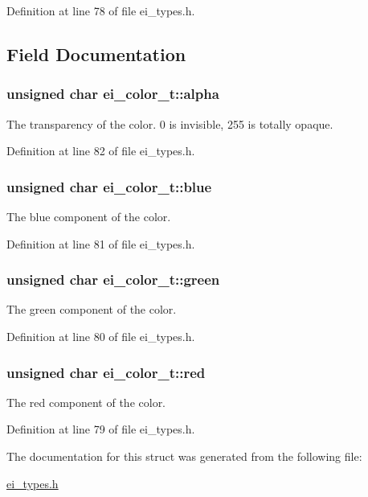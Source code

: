 Definition at line 78 of file ei\_\-types.h.

\subsection{Field Documentation}
\hypertarget{structei__color__t_af213a14356db920b1a04f5270263ae61}{
\subsubsection[{alpha}]{\setlength{\rightskip}{0pt plus 5cm}unsigned char {\bf ei\_\-color\_\-t::alpha}}}
\label{structei__color__t_af213a14356db920b1a04f5270263ae61}


The transparency of the color. 0 is invisible, 255 is totally opaque. 

Definition at line 82 of file ei\_\-types.h.\hypertarget{structei__color__t_af8d67b7a72cbb586519b55033350fb8c}{
\subsubsection[{blue}]{\setlength{\rightskip}{0pt plus 5cm}unsigned char {\bf ei\_\-color\_\-t::blue}}}
\label{structei__color__t_af8d67b7a72cbb586519b55033350fb8c}


The blue component of the color. 

Definition at line 81 of file ei\_\-types.h.\hypertarget{structei__color__t_ad85ce262fb9c76fe3c52b4eed19505d1}{
\subsubsection[{green}]{\setlength{\rightskip}{0pt plus 5cm}unsigned char {\bf ei\_\-color\_\-t::green}}}
\label{structei__color__t_ad85ce262fb9c76fe3c52b4eed19505d1}


The green component of the color. 

Definition at line 80 of file ei\_\-types.h.\hypertarget{structei__color__t_a9adf283c79176b3426ac63784f0bc17b}{
\subsubsection[{red}]{\setlength{\rightskip}{0pt plus 5cm}unsigned char {\bf ei\_\-color\_\-t::red}}}
\label{structei__color__t_a9adf283c79176b3426ac63784f0bc17b}


The red component of the color. 

Definition at line 79 of file ei\_\-types.h.

The documentation for this struct was generated from the following file:\begin{DoxyCompactItemize}
\item 
\hyperlink{ei__types_8h}{ei\_\-types.h}\end{DoxyCompactItemize}
